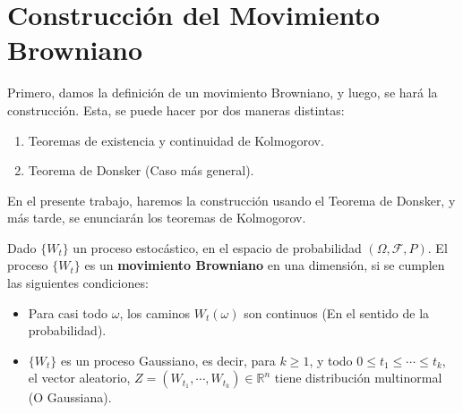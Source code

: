 \section{Construcción del Movimiento Browniano}

Primero, damos la definición de un movimiento Browniano, y luego, se hará la construcción. Esta, se puede hacer por dos maneras distintas:

\begin{enumerate}
	\item Teoremas de existencia y continuidad de Kolmogorov.
	\item Teorema de Donsker (Caso más general).
\end{enumerate}

En el presente trabajo, haremos la construcción usando el Teorema de Donsker, y más tarde, se enunciarán los teoremas de Kolmogorov.

\begin{boxDef}
	Dado $\{ W_t \}$ un proceso estocástico, en el espacio de probabilidad $(\Omega, \mathcal{F}, P)$. El proceso $\{ W_t \}$ es un \textbf{movimiento Browniano} en una dimensión, si se cumplen las siguientes condiciones:

	\begin{itemize}
		\item Para casi todo $\omega$, los caminos $W_t (\omega)$ son continuos (En el sentido de la probabilidad).
		\item $\{ W_t \}$ es un proceso Gaussiano, es decir, para $k \geq 1$, y todo $0 \leq t_1 \leq \cdots \leq t_k$, el vector aleatorio, $Z = (W_{t_1}, \cdots, W_{t_k}) \in \mathbb{R}^{n}$ tiene distribución multinormal (O Gaussiana).
	\end{itemize}

\end{boxDef}